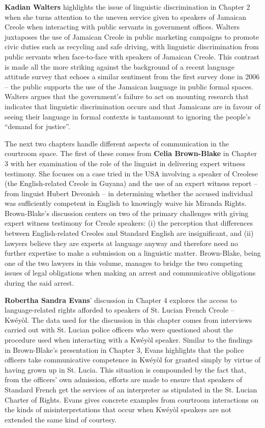 \textbf{Kadian Walters} highlights the issue of linguistic discrimination in Chapter 2 when she turns attention to the uneven service given to speakers of Jamaican Creole when interacting with public servants in government offices. Walters juxtaposes the use of Jamaican Creole in public marketing campaigns to promote civic duties such as recycling and safe driving, with linguistic discrimination from public servants when face-to-face with speakers of Jamaican Creole. This contrast is made all the more striking against the background of a recent language attitude survey that echoes a similar sentiment from the first survey done in 2006 -- the public supports the use of the Jamaican language in public formal spaces. Walters argues that the government’s failure to act on mounting research that indicates that linguistic discrimination occurs and that Jamaicans are in favour of seeing their language in formal contexts is tantamount to ignoring the people’s “demand for justice”. 

The next two chapters handle different aspects of communication in the courtroom space. The first of these comes from \textbf{Celia Brown-Blake} in Chapter 3 with her examination of the role of the linguist in delivering expert witness testimony. She focuses on a case tried in the USA involving a speaker of Creolese (the English-related Creole in Guyana) and the use of an expert witness report -- from linguist Hubert Devonish -- in determining whether the accused individual was sufficiently competent in English to knowingly waive his Miranda Rights. Brown-Blake’s discussion centers on two of the primary challenges with giving expert witness testimony for Creole speakers: (i) the perception that differences between English-related Creoles and Standard English are insignificant, and (ii) lawyers believe they are experts at language anyway and therefore need no further expertise to make a submission on a linguistic matter. Brown-Blake, being one of the two lawyers in this volume, manages to bridge the two competing issues of legal obligations when making an arrest and communicative obligations during the said arrest. 

\textbf{Robertha Sandra Evans}’ discussion in Chapter 4 explores the access to lan\-guage-re\-lat\-ed rights afforded to speakers of St. Lucian French Creole -- Kwéyòl. The data used for the discussion in this chapter comes from interviews carried out with St. Lucian police officers who were questioned about the procedure used when interacting with a Kwéyòl speaker. Similar to the findings in Brown-Blake’s presentation in Chapter 3, Evans highlights that the police officers take communicative competence in Kwéyòl for granted simply by virtue of having grown up in St. Lucia. This situation is compounded by the fact that, from the officers’ own admission, efforts are made to ensure that speakers of Standard French get the services of an interpreter as stipulated in the St. Lucian Charter of Rights. Evans gives concrete examples from courtroom interactions on the kinds of misinterpretations that occur when Kwéyòl speakers are not extended the same kind of courtesy. 

